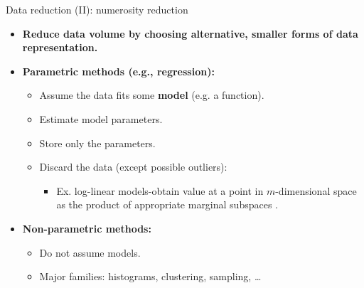 \documentclass[aspectratio=169,t]{beamer}
\begin{document}
  { 
    \begin{frame}{Data reduction (II): numerosity reduction}
    \begin{itemize}
      \item \textbf{Reduce data volume by choosing alternative, {\color{airforceblue}smaller} forms of data representation.}
      \item \textbf{{\color{airforceblue}Parametric} methods (e.g., regression):}
      \begin{itemize}
        \item Assume the data fits some \textbf{{\color{airforceblue}model}} (e.g. a function).
        \item Estimate model parameters.
        \item Store only the parameters.
        \item Discard the data (except possible outliers):
        \begin{itemize}
          \item Ex. log-linear models-obtain value at a point in $m$-dimensional space as the product of appropriate marginal subspaces .
        \end{itemize}
      \end{itemize}
      \item \textbf{{\color{airforceblue}Non-parametric} methods:}
      \begin{itemize}
        \item Do not assume models.
        \item Major families: histograms, clustering, sampling, \ldots
      \end{itemize}
    \end{itemize}
    \end{frame}
  }
\end{document}
